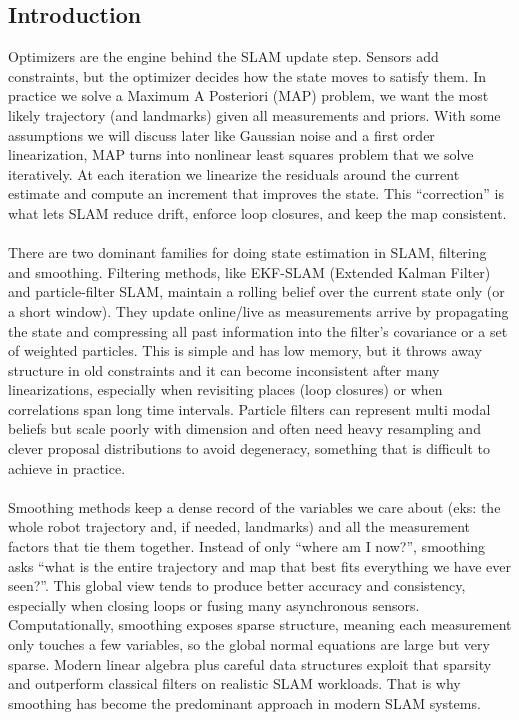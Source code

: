 \subsection{Introduction}
Optimizers are the engine behind the SLAM update step. Sensors add constraints, but the optimizer decides how the state moves to satisfy them. In practice we solve a Maximum A Posteriori (MAP) problem, we want the most likely trajectory (and landmarks) given all measurements and priors. With some assumptions we will discuss later like Gaussian noise and a first order linearization, MAP turns into nonlinear least squares problem that we solve iteratively. At each iteration we linearize the residuals around the current estimate and compute an increment that improves the state. This ``correction'' is what lets SLAM reduce drift, enforce loop closures, and keep the map consistent. \cite{SLAM_part_present_future}
\\ \\
There are two dominant families for doing state estimation in SLAM, filtering and smoothing. Filtering methods, like EKF-SLAM (Extended Kalman Filter) and particle-filter SLAM, maintain a rolling belief over the current state only (or a short window). They update online/live as measurements arrive by propagating the state and compressing all past information into the filter's covariance or a set of weighted particles. This is simple and has low memory, but it throws away structure in old constraints and it can become inconsistent after many linearizations, especially when revisiting places (loop closures) or when correlations span long time intervals. Particle filters can represent multi modal beliefs but scale poorly with dimension and often need heavy resampling and clever proposal distributions to avoid degeneracy, something that is difficult to achieve in practice. \cite{SLAM_tutorial_part_1}\cite{SLAM_tutorial_part_2}
\\ \\
Smoothing methods keep a dense record of the variables we care about (eks: the whole robot trajectory and, if needed, landmarks) and all the measurement factors that tie them together. Instead of only ``where am I now?'', smoothing asks ``what is the entire trajectory and map that best fits everything we have ever seen?''. This global view tends to produce better accuracy and consistency, especially when closing loops or fusing many asynchronous sensors. Computationally, smoothing exposes sparse structure, meaning each measurement only touches a few variables, so the global normal equations are large but very sparse. Modern linear algebra plus careful data structures exploit that sparsity and outperform classical filters on realistic SLAM workloads. That is why smoothing has become the predominant approach in modern SLAM systems.
